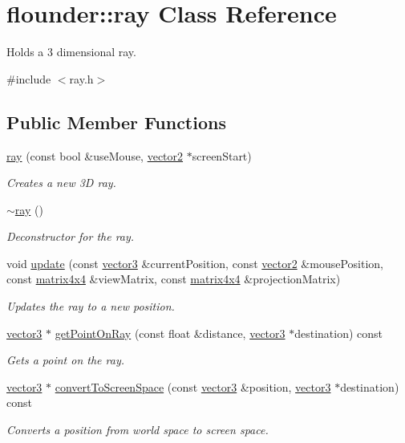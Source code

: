 \hypertarget{classflounder_1_1ray}{}\section{flounder\+:\+:ray Class Reference}
\label{classflounder_1_1ray}


Holds a 3 dimensional ray.  




{\ttfamily \#include $<$ray.\+h$>$}

\subsection*{Public Member Functions}
\begin{DoxyCompactItemize}
\item 
\hyperlink{classflounder_1_1ray_adc2baacdaf66bd982c3b48827d53d103}{ray} (const bool \&use\+Mouse, \hyperlink{classflounder_1_1vector2}{vector2} $\ast$screen\+Start)
\begin{DoxyCompactList}\small\item\em Creates a new 3D ray. \end{DoxyCompactList}\item 
\hyperlink{classflounder_1_1ray_a22e1374c250bbad557f01428b95d7fe1}{$\sim$ray} ()
\begin{DoxyCompactList}\small\item\em Deconstructor for the ray. \end{DoxyCompactList}\item 
void \hyperlink{classflounder_1_1ray_ade6d4c4db0c0f68eaa2b0f00b0c6724c}{update} (const \hyperlink{classflounder_1_1vector3}{vector3} \&current\+Position, const \hyperlink{classflounder_1_1vector2}{vector2} \&mouse\+Position, const \hyperlink{classflounder_1_1matrix4x4}{matrix4x4} \&view\+Matrix, const \hyperlink{classflounder_1_1matrix4x4}{matrix4x4} \&projection\+Matrix)
\begin{DoxyCompactList}\small\item\em Updates the ray to a new position. \end{DoxyCompactList}\item 
\hyperlink{classflounder_1_1vector3}{vector3} $\ast$ \hyperlink{classflounder_1_1ray_ab08982d3adaaa4ea6db3e1615749a298}{get\+Point\+On\+Ray} (const float \&distance, \hyperlink{classflounder_1_1vector3}{vector3} $\ast$destination) const
\begin{DoxyCompactList}\small\item\em Gets a point on the ray. \end{DoxyCompactList}\item 
\hyperlink{classflounder_1_1vector3}{vector3} $\ast$ \hyperlink{classflounder_1_1ray_a6770cbc5a1826141b46e08be39d542b5}{convert\+To\+Screen\+Space} (const \hyperlink{classflounder_1_1vector3}{vector3} \&position, \hyperlink{classflounder_1_1vector3}{vector3} $\ast$destination) const
\begin{DoxyCompactList}\small\item\em Converts a position from world space to screen space. \end{DoxyCompactList}\end{DoxyCompactItemize}
